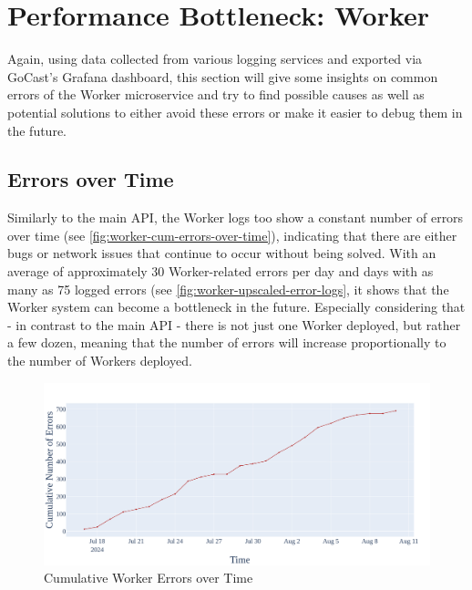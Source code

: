 
\section{Performance Bottleneck: Worker}

Again, using data collected from various logging services and exported via GoCast's Grafana dashboard, this section will give some insights on common errors of the Worker microservice and try to find possible causes as well as potential solutions to either avoid these errors or make it easier to debug them in the future.  

\subsection{Errors over Time}

Similarly to the main \ac{API}, the Worker logs too show a constant number of errors over time (see \autoref{fig:worker-cum-errors-over-time}), indicating that there are either bugs or network issues that continue to occur without being solved. With an average of approximately 30 Worker-related errors per day and days with as many as 75 logged errors (see \autoref{fig:worker-upscaled-error-logs}, it shows that the Worker system can become a bottleneck in the future. Especially considering that - in contrast to the main \ac{API} - there is not just one Worker deployed, but rather a few dozen, meaning that the number of errors will increase proportionally to the number of Workers deployed. 

\begin{figure}[htpb]
    \centering
    \includegraphics[width=\linewidth]{images/plots/worker/cum_errors_over_time.png}
    \caption[Cumulative Worker Errors over Time]{Cumulative Worker Errors over Time}\label{fig:worker-cum-errors-over-time}
\end{figure}

